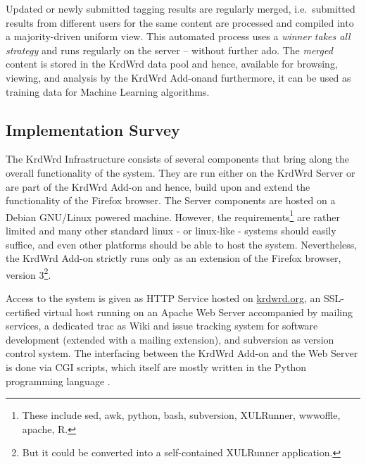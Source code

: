 \begin{longversion}
Updated or newly submitted tagging results are regularly merged, i.e.~submitted results from different users for the same content are processed and compiled into a majority-driven uniform view.
This automated process uses a \emph{winner takes all strategy} and runs regularly on the server -- without further ado.
The \emph{merged} content is stored in the KrdWrd data pool and hence, available for browsing, viewing, and analysis by the KrdWrd Add-on\footnotemark[\value{footnote}] and furthermore, it can be used as training data for Machine Learning algorithms. 


\subsection{Implementation Survey}

The KrdWrd Infrastructure consists of several components that bring along the overall functionality of the system. 
They are run either on the KrdWrd Server or are part of the KrdWrd Add-on and hence, build upon and extend the functionality of the Firefox browser.
The Server components are hosted on a Debian GNU/Linux \cite{debian.org} powered machine.
However, the requirements\footnote{These include sed, awk, python, bash, subversion, XULRunner, wwwoffle, apache, R.} are rather limited and many other standard linux - or linux-like - systems should easily suffice, and even other platforms should be able to host the system. 
Nevertheless, the KrdWrd Add-on strictly runs only as an extension of the Firefox browser, version 3\footnote{But it could be converted into a self-contained XULRunner application.}.

Access to the system is given as HTTP Service hosted on \url{krdwrd.org}, an SSL-certified virtual host running on an Apache Web Server \cite{httpd.apache.org} accompanied by mailing services, a dedicated trac as Wiki and issue tracking system for software development (extended with a mailing extension), and subversion \cite{subversion} as version control system.
The interfacing between the KrdWrd Add-on and the Web Server is done via CGI \cite{cgi} scripts, which itself are mostly written in the Python programming language \cite{python}.
%
%
\end{longversion}
